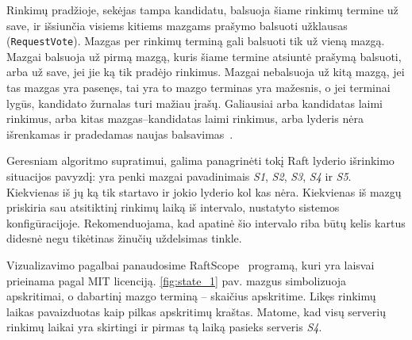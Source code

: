\documentclass{VUMIFPSkursinis}
\begin{document}
Rinkimų pradžioje, sekėjas tampa kandidatu, balsuoja šiame rinkimų termine už save, ir išsiunčia visiems kitiems mazgams prašymo balsuoti užklausas (\texttt{RequestVote}). Mazgas per rinkimų terminą gali balsuoti tik už vieną mazgą. Mazgai balsuoja už pirmą mazgą, kuris šiame termine atsiuntė prašymą balsuoti, arba už save, jei jie ką tik pradėjo rinkimus. Mazgai nebalsuoja už kitą mazgą, jei tas mazgas yra pasenęs, tai yra to mazgo terminas yra mažesnis, o jei terminai lygūs, kandidato žurnalas turi mažiau įrašų. Galiausiai arba kandidatas laimi rinkimus, arba kitas mazgas--kandidatas laimi rinkimus, arba lyderis nėra išrenkamas ir pradedamas naujas balsavimas~\cite{ongaro_consensus}.

Geresniam algoritmo supratimui, galima panagrinėti tokį Raft lyderio išrinkimo situacijos pavyzdį: yra penki mazgai pavadinimais \textit{S1}, \textit{S2}, \textit{S3}, \textit{S4} ir \textit{S5}. Kiekvienas iš jų ką tik startavo ir jokio lyderio kol kas nėra. Kiekvienas iš mazgų priskiria sau atsitiktinį rinkimų laiką iš intervalo, nustatyto sistemos konfigūracijoje. Rekomenduojama, kad apatinė šio intervalo riba būtų kelis kartus didesnė negu tikėtinas žinučių uždelsimas tinkle. 

Vizualizavimo pagalbai panaudosime RaftScope~\cite{ongaro_raftscope_2020} programą, kuri yra laisvai prieinama pagal MIT licenciją. \ref{fig:state_1} pav. mazgus simbolizuoja apskritimai, o dabartinį mazgo terminą -- skaičius apskritime. Likęs rinkimų laikas pavaizduotas kaip pilkas apskritimų kraštas. Matome, kad visų serverių rinkimų laikai yra skirtingi ir pirmas tą laiką pasieks serveris \textit{S4}.
\end{document}
